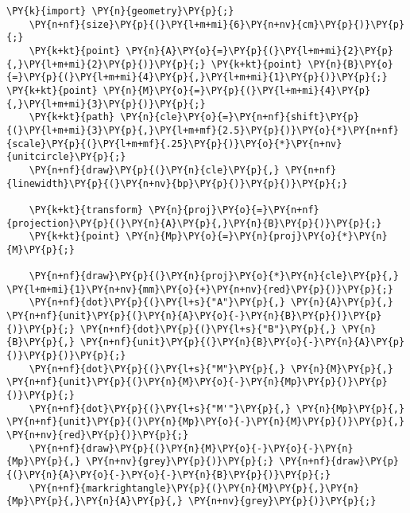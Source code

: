 \begin{Verbatim}[commandchars=\\\{\}]
    \PY{k}{import} \PY{n}{geometry}\PY{p}{;}
    \PY{n+nf}{size}\PY{p}{(}\PY{l+m+mi}{6}\PY{n+nv}{cm}\PY{p}{)}\PY{p}{;}
    \PY{k+kt}{point} \PY{n}{A}\PY{o}{=}\PY{p}{(}\PY{l+m+mi}{2}\PY{p}{,}\PY{l+m+mi}{2}\PY{p}{)}\PY{p}{;} \PY{k+kt}{point} \PY{n}{B}\PY{o}{=}\PY{p}{(}\PY{l+m+mi}{4}\PY{p}{,}\PY{l+m+mi}{1}\PY{p}{)}\PY{p}{;} \PY{k+kt}{point} \PY{n}{M}\PY{o}{=}\PY{p}{(}\PY{l+m+mi}{4}\PY{p}{,}\PY{l+m+mi}{3}\PY{p}{)}\PY{p}{;}
    \PY{k+kt}{path} \PY{n}{cle}\PY{o}{=}\PY{n+nf}{shift}\PY{p}{(}\PY{l+m+mi}{3}\PY{p}{,}\PY{l+m+mf}{2.5}\PY{p}{)}\PY{o}{*}\PY{n+nf}{scale}\PY{p}{(}\PY{l+m+mf}{.25}\PY{p}{)}\PY{o}{*}\PY{n+nv}{unitcircle}\PY{p}{;}
    \PY{n+nf}{draw}\PY{p}{(}\PY{n}{cle}\PY{p}{,} \PY{n+nf}{linewidth}\PY{p}{(}\PY{n+nv}{bp}\PY{p}{)}\PY{p}{)}\PY{p}{;}

    \PY{k+kt}{transform} \PY{n}{proj}\PY{o}{=}\PY{n+nf}{projection}\PY{p}{(}\PY{n}{A}\PY{p}{,}\PY{n}{B}\PY{p}{)}\PY{p}{;}
    \PY{k+kt}{point} \PY{n}{Mp}\PY{o}{=}\PY{n}{proj}\PY{o}{*}\PY{n}{M}\PY{p}{;}

    \PY{n+nf}{draw}\PY{p}{(}\PY{n}{proj}\PY{o}{*}\PY{n}{cle}\PY{p}{,} \PY{l+m+mi}{1}\PY{n+nv}{mm}\PY{o}{+}\PY{n+nv}{red}\PY{p}{)}\PY{p}{;}
    \PY{n+nf}{dot}\PY{p}{(}\PY{l+s}{"A"}\PY{p}{,} \PY{n}{A}\PY{p}{,} \PY{n+nf}{unit}\PY{p}{(}\PY{n}{A}\PY{o}{-}\PY{n}{B}\PY{p}{)}\PY{p}{)}\PY{p}{;} \PY{n+nf}{dot}\PY{p}{(}\PY{l+s}{"B"}\PY{p}{,} \PY{n}{B}\PY{p}{,} \PY{n+nf}{unit}\PY{p}{(}\PY{n}{B}\PY{o}{-}\PY{n}{A}\PY{p}{)}\PY{p}{)}\PY{p}{;}
    \PY{n+nf}{dot}\PY{p}{(}\PY{l+s}{"M"}\PY{p}{,} \PY{n}{M}\PY{p}{,} \PY{n+nf}{unit}\PY{p}{(}\PY{n}{M}\PY{o}{-}\PY{n}{Mp}\PY{p}{)}\PY{p}{)}\PY{p}{;}
    \PY{n+nf}{dot}\PY{p}{(}\PY{l+s}{"M'"}\PY{p}{,} \PY{n}{Mp}\PY{p}{,} \PY{n+nf}{unit}\PY{p}{(}\PY{n}{Mp}\PY{o}{-}\PY{n}{M}\PY{p}{)}\PY{p}{,} \PY{n+nv}{red}\PY{p}{)}\PY{p}{;}
    \PY{n+nf}{draw}\PY{p}{(}\PY{n}{M}\PY{o}{-}\PY{o}{-}\PY{n}{Mp}\PY{p}{,} \PY{n+nv}{grey}\PY{p}{)}\PY{p}{;} \PY{n+nf}{draw}\PY{p}{(}\PY{n}{A}\PY{o}{-}\PY{o}{-}\PY{n}{B}\PY{p}{)}\PY{p}{;}
    \PY{n+nf}{markrightangle}\PY{p}{(}\PY{n}{M}\PY{p}{,}\PY{n}{Mp}\PY{p}{,}\PY{n}{A}\PY{p}{,} \PY{n+nv}{grey}\PY{p}{)}\PY{p}{;}
\end{Verbatim}
